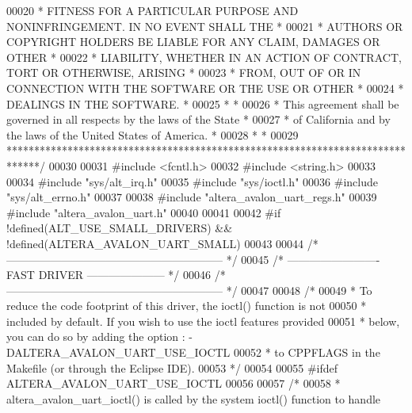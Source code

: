 \begin{DoxyCode}
00020 \textcolor{comment}{* FITNESS FOR A PARTICULAR PURPOSE AND NONINFRINGEMENT. IN NO EVENT SHALL THE *}
00021 \textcolor{comment}{* AUTHORS OR COPYRIGHT HOLDERS BE LIABLE FOR ANY CLAIM, DAMAGES OR OTHER      *}
00022 \textcolor{comment}{* LIABILITY, WHETHER IN AN ACTION OF CONTRACT, TORT OR OTHERWISE, ARISING     *}
00023 \textcolor{comment}{* FROM, OUT OF OR IN CONNECTION WITH THE SOFTWARE OR THE USE OR OTHER         *}
00024 \textcolor{comment}{* DEALINGS IN THE SOFTWARE.                                                   *}
00025 \textcolor{comment}{*                                                                             *}
00026 \textcolor{comment}{* This agreement shall be governed in all respects by the laws of the State   *}
00027 \textcolor{comment}{* of California and by the laws of the United States of America.              *}
00028 \textcolor{comment}{*                                                                             *}
00029 \textcolor{comment}{******************************************************************************/}
00030 
00031 \textcolor{preprocessor}{#include <fcntl.h>}
00032 \textcolor{preprocessor}{#include <string.h>}
00033 
00034 \textcolor{preprocessor}{#include "sys/alt_irq.h"}
00035 \textcolor{preprocessor}{#include "sys/ioctl.h"}
00036 \textcolor{preprocessor}{#include "sys/alt_errno.h"}
00037 
00038 \textcolor{preprocessor}{#include "altera_avalon_uart_regs.h"}
00039 \textcolor{preprocessor}{#include "altera_avalon_uart.h"}
00040 
00041 
00042 \textcolor{preprocessor}{#if !defined(ALT\_USE\_SMALL\_DRIVERS) && !defined(ALTERA\_AVALON\_UART\_SMALL)}
00043 
00044 \textcolor{comment}{/* ----------------------------------------------------------- */}
00045 \textcolor{comment}{/* ------------------------- FAST DRIVER --------------------- */}
00046 \textcolor{comment}{/* ----------------------------------------------------------- */}
00047 
00048 \textcolor{comment}{/*}
00049 \textcolor{comment}{ * To reduce the code footprint of this driver, the ioctl() function is not}
00050 \textcolor{comment}{ * included by default. If you wish to use the ioctl features provided }
00051 \textcolor{comment}{ * below, you can do so by adding the option : -DALTERA\_AVALON\_UART\_USE\_IOCTL}
00052 \textcolor{comment}{ * to CPPFLAGS in the Makefile (or through the Eclipse IDE).}
00053 \textcolor{comment}{ */}
00054 
00055 \textcolor{preprocessor}{#ifdef ALTERA\_AVALON\_UART\_USE\_IOCTL}
00056 
00057 \textcolor{comment}{/*}
00058 \textcolor{comment}{ * altera\_avalon\_uart\_ioctl() is called by the system ioctl() function to handle}

\end{DoxyCode}
